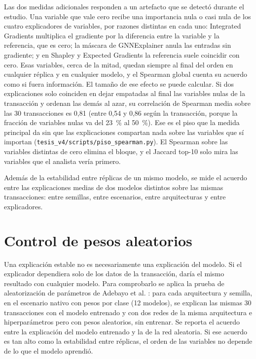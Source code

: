 Las dos medidas adicionales responden a un artefacto que se detectó durante el estudio. Una
variable que vale cero recibe una importancia nula o casi nula de los cuatro explicadores de
variables, por razones distintas en cada uno: Integrated Gradients multiplica el gradiente por
la diferencia entre la variable y la referencia, que es cero; la máscara de GNNExplainer anula
las entradas sin gradiente; y en Shapley y Expected Gradients la referencia suele coincidir con
cero. Esas variables, cerca de la mitad, quedan siempre al final del orden en cualquier
réplica y en cualquier modelo, y el Spearman global cuenta su acuerdo como si fuera
información. El tamaño de ese efecto se puede calcular. Si dos explicaciones solo coinciden en
dejar empatadas al final las variables nulas de la transacción y ordenan las demás al azar, su
correlación de Spearman media sobre las 30 transacciones es 0,81 (entre 0,54 y 0,86 según la
transacción, porque la fracción de variables nulas va del 23~\% al 50~\%). Ese es el piso que la
medida principal da sin que las explicaciones compartan nada sobre las variables que sí
importan (\texttt{tesis\_v4/scripts/piso\_spearman.py}).
El Spearman sobre las variables distintas de cero elimina el bloque, y el Jaccard top-10 solo
mira las variables que el analista vería primero.

Además de la estabilidad entre réplicas de un mismo modelo, se mide el acuerdo entre las
explicaciones medias de dos modelos distintos sobre las mismas transacciones: entre semillas,
entre escenarios, entre arquitecturas y entre explicadores.

\section{Control de pesos aleatorios}\label{sec:control}

Una explicación estable no es necesariamente una explicación del modelo. Si el explicador
dependiera solo de los datos de la transacción, daría el mismo resultado con cualquier modelo.
Para comprobarlo se aplica la prueba de aleatorización de parámetros de Adebayo et al.
\cite{Adebayo2018Sanity}: para cada arquitectura y semilla, en el escenario nativo con pesos por
clase (12 modelos), se explican las mismas 30 transacciones con el modelo entrenado y con dos
redes de la misma arquitectura e hiperparámetros pero con pesos aleatorios, sin entrenar. Se
reporta el acuerdo entre la explicación del modelo entrenado y la de la red aleatoria. Si ese
acuerdo es tan alto como la estabilidad entre réplicas, el orden de las variables no depende
de lo que el modelo aprendió.

